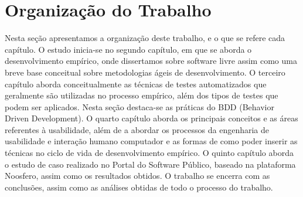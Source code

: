 \section{Organização do Trabalho}


Nesta seção apresentamos a organização deste trabalho, e o que se refere cada capítulo.
%
O estudo inicia-se no segundo capítulo, em que se aborda o desenvolvimento empírico, onde dissertamos sobre software livre assim como uma breve base conceitual sobre metodologias ágeis de desenvolvimento.
%
O terceiro capítulo aborda conceitualmente as técnicas de testes automatizados que geralmente são utilizadas no processo empírico, além dos tipos de testes que podem ser aplicados. Nesta seção destaca-se as práticas do BDD (Behavior Driven Development).
%
O quarto capítulo aborda os principais conceitos e as áreas referentes à usabilidade, além de a abordar os processos da engenharia de usabilidade e interação humano computador e as formas de como poder inserir as técnicas no ciclo de vida de desenvolvimento empírico.
%
O quinto capítulo aborda o estudo de caso realizado no Portal do Software Público, baseado na plataforma Noosfero, assim como os resultados obtidos.
%
O trabalho se encerra com as conclusões, assim como as análises obtidas de todo o processo do trabalho.

